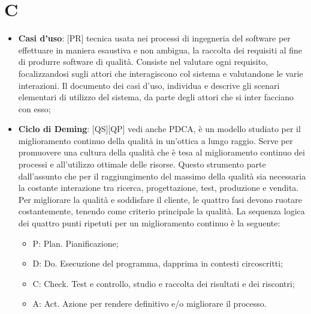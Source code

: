 % 
%
%

\section{C}

	\begin{itemize}
		\item \textbf{Casi d'uso}: [PR] tecnica usata nei processi di ingegneria del software per effettuare in maniera esaustiva e non ambigua, la raccolta dei requisiti al fine di produrre software di qualità. Consiste nel valutare ogni requisito, focalizzandosi sugli attori che interagiscono col sistema e valutandone le varie interazioni. Il documento dei casi d’uso, individua e descrive gli scenari elementari di utilizzo del sistema, da parte degli attori che si inter facciano con esso;

		\item \textbf{Ciclo di Deming}: [QS][QP] vedi anche PDCA, è un modello studiato per il miglioramento continuo della qualità in un’ottica a lungo raggio. Serve per promuovere una cultura della qualità che è tesa al miglioramento continuo dei processi e all’utilizzo ottimale delle risorse. Questo strumento parte dall’assunto che per il raggiungimento del massimo della qualità sia necessaria la costante interazione tra ricerca, progettazione, test, produzione e vendita. \newline
	Per migliorare la qualità e soddisfare il cliente, le quattro fasi devono ruotare costantemente, tenendo come criterio principale la qualità.
	La sequenza logica dei quattro punti ripetuti per un miglioramento continuo è la seguente:
		\begin{itemize}
			\item P: Plan. Pianificazione;
			\item D: Do. Esecuzione del programma, dapprima in contesti circoscritti;
			\item C: Check. Test e controllo, studio e raccolta dei risultati e dei riscontri;
			\item A: Act. Azione per rendere definitivo e/o migliorare il processo.
		\end{itemize}


\end{itemize}

